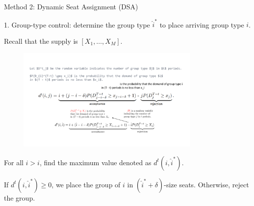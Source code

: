     \begin{frame}{Method 2: Dynamic Seat Assignment (DSA)}
      

      1. {\color{red} Group-type control}: determine the group type $\hat{i}^{*}$ to place arriving group type $i$. 
      
      \vspace{0.2cm}

      Recall that the supply is $[X_1, \ldots, X_M]$. 

      \vspace{-0.1cm}
  
      \begin{figure}[h]
        \centering
        \includegraphics[width = 0.8\textwidth]{./images/group_type.pdf}
      \end{figure}
  
      \vspace{-0.1cm}
  
      For all $\hat{i} > i$, find the maximum value denoted as $d^{t}(i, \hat{i}^{*})$.
      \vspace{0.1cm}

      If $d^{t}(i, \hat{i}^{*}) \geq 0$, we place the group of $i$ in $(\hat{i}^{*} + \delta)$-size seats. Otherwise, reject the group.
    \end{frame}


